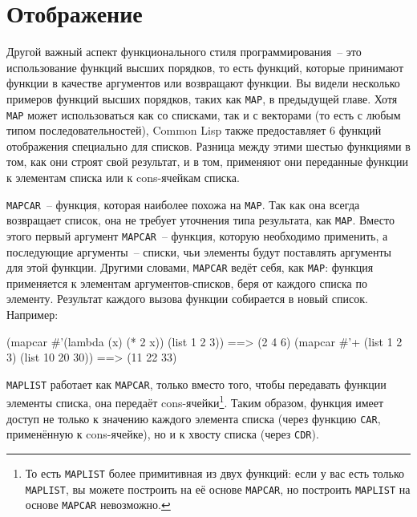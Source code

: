 \section{Отображение}
\label{sec:12-map}

Другой важный аспект функционального стиля программирования~-- это использование функций
высших порядков, то есть функций, которые принимают функции в качестве аргументов или
возвращают функции. Вы видели несколько примеров функций высших порядков, таких как
\lstinline{MAP}, в предыдущей главе. Хотя \lstinline{MAP} может использоваться как со списками, так
и с векторами (то есть с любым типом последовательностей), Common Lisp также предоставляет 6
функций отображения специально для списков. Разница между этими шестью функциями в том, как
они строят свой результат, и в том, применяют они переданные функции к элементам списка
или к cons-ячейкам списка.

\lstinline{MAPCAR}~-- функция, которая наиболее похожа на \lstinline{MAP}. Так как она всегда возвращает список,
она не требует уточнения типа результата, как \lstinline{MAP}. Вместо этого первый аргумент
\lstinline{MAPCAR}~-- функция, которую необходимо применить, а последующие аргументы~-- списки,
чьи элементы будут поставлять аргументы для этой функции. Другими словами, \lstinline{MAPCAR}
ведёт себя, как \lstinline{MAP}: функция применяется к элементам аргументов-списков, беря от
каждого списка по элементу. Результат каждого вызова функции собирается в новый
список. Например:

\begin{myverb}
(mapcar #'(lambda (x) (* 2 x)) (list 1 2 3)) ==> (2 4 6)
(mapcar #'+ (list 1 2 3) (list 10 20 30))    ==> (11 22 33)
\end{myverb}

\lstinline{MAPLIST} работает как \lstinline{MAPCAR}, только вместо того, чтобы передавать функции
элементы списка, она передаёт cons-ячейки\footnote{То есть \lstinline{MAPLIST} более примитивная
  из двух функций: если у вас есть только \lstinline{MAPLIST}, вы можете построить на её основе
  \lstinline{MAPCAR}, но построить \lstinline{MAPLIST} на основе \lstinline{MAPCAR} невозможно.}\hspace{\footnotenegspace}.  Таким
образом, функция имеет доступ не только к значению каждого элемента списка (через функцию
\lstinline{CAR}, применённую к cons-ячейке), но и к хвосту списка (через \lstinline{CDR}).

